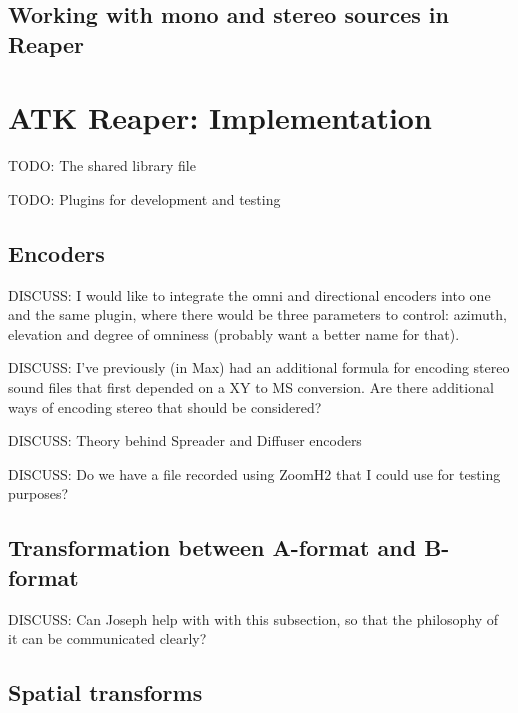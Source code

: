 \documentclass{article}
\begin{document}
\subsection{Working with mono and stereo sources in Reaper}


\section{ATK Reaper: Implementation}\label{sec:implementation}

TODO: The shared library file

TODO: Plugins for development and testing

\subsection{Encoders}\label{sec:encoders}



DISCUSS: I would like to integrate the omni and directional encoders into one and the same plugin, where there would be three parameters to control: azimuth, elevation and degree of omniness (probably want a better name for that).

DISCUSS: I've previously (in Max) had an additional formula for encoding stereo sound files that first depended on a XY to MS conversion. Are there additional ways of encoding stereo that should be considered?

DISCUSS: Theory behind Spreader and Diffuser encoders

DISCUSS: Do we have a file recorded using ZoomH2 that I could use for testing purposes?




\subsection{Transformation between A-format and B-format}\label{sec:a-format}

DISCUSS: Can Joseph help with with this subsection, so that the philosophy of it can be communicated clearly?




\subsection{Spatial transforms}\label{sec:transforms}
\end{document}
